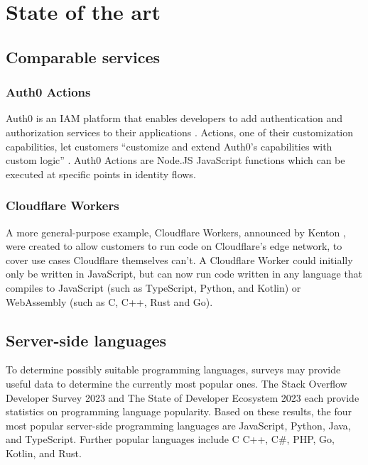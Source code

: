 
\section{State of the art}%
\label{sec:state-of-the-art}

\subsection{Comparable services}
\subsubsection{Auth0 Actions}
Auth0 is an IAM platform that enables developers to add authentication and authorization services to their applications \autocite{Auth0Overview}. Actions, one of their customization capabilities, let customers ``customize and extend Auth0's capabilities with custom logic'' \autocite{Auth0Actions}. Auth0 Actions are Node.JS JavaScript functions which can be executed at specific points in identity flows.

\subsubsection{Cloudflare Workers}
A more general-purpose example, Cloudflare Workers, announced by Kenton \textcite{Varda2017}, were created to allow customers to run code on Cloudflare's edge network, to cover use cases Cloudflare themselves can't. A Cloudflare Worker could initially only be written in JavaScript, but can now run code written in any language that compiles to JavaScript (such as TypeScript, Python, and Kotlin) or WebAssembly (such as C, C++, Rust and Go). \autocite{Varda2018, Koeninger2020}

\subsection{Server-side languages}
To determine possibly suitable programming languages, surveys may provide useful data to determine the currently most popular ones. The Stack Overflow Developer Survey 2023 \autocite{StackOverflow2023} and The State of Developer Ecosystem 2023 \autocite{JetBrains2023} each provide statistics on programming language popularity. Based on these results, the four most popular server-side programming languages are JavaScript, Python, Java, and TypeScript. Further popular languages include   C C++, C\#, PHP, Go, Kotlin, and Rust.

